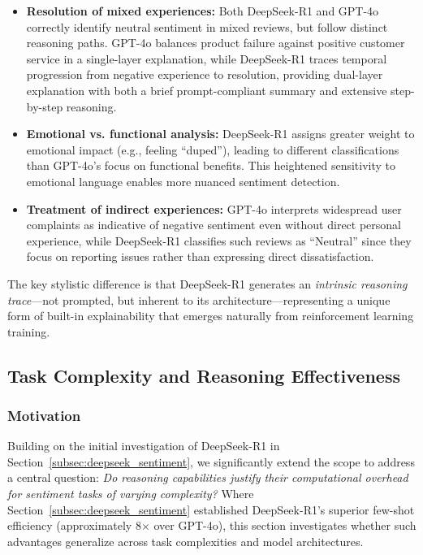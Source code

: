 \begin{itemize}[leftmargin=*]
    \item \textbf{Resolution of mixed experiences:} Both DeepSeek-R1 and GPT-4o correctly identify neutral sentiment in mixed reviews, but follow distinct reasoning paths. GPT-4o balances product failure against positive customer service in a single-layer explanation, while DeepSeek-R1 traces temporal progression from negative experience to resolution, providing dual-layer explanation with both a brief prompt-compliant summary and extensive step-by-step reasoning.
    
    \item \textbf{Emotional vs. functional analysis:} DeepSeek-R1 assigns greater weight to emotional impact (e.g., feeling ``duped''), leading to different classifications than GPT-4o's focus on functional benefits. This heightened sensitivity to emotional language enables more nuanced sentiment detection.
    
    \item \textbf{Treatment of indirect experiences:} GPT-4o interprets widespread user complaints as indicative of negative sentiment even without direct personal experience, while DeepSeek-R1 classifies such reviews as ``Neutral'' since they focus on reporting issues rather than expressing direct dissatisfaction.
\end{itemize}

The key stylistic difference is that DeepSeek-R1 generates an \textit{intrinsic reasoning trace}---not prompted, but inherent to its architecture---representing a unique form of built-in explainability that emerges naturally from reinforcement learning training.

\subsection{Task Complexity and Reasoning Effectiveness}
\label{subsec:task_complexity}

\subsubsection{Motivation}

Building on the initial investigation of DeepSeek-R1 in Section~\ref{subsec:deepseek_sentiment}, we significantly extend the scope to address a central question: \textit{Do reasoning capabilities justify their computational overhead for sentiment tasks of varying complexity?} Where Section~\ref{subsec:deepseek_sentiment} established DeepSeek-R1's superior few-shot efficiency (approximately 8$\times$ over GPT-4o), this section investigates whether such advantages generalize across task complexities and model architectures.

